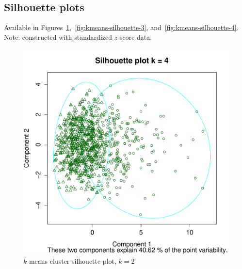 \documentclass[letterpaper,12pt]{article}
\begin{document}
\subsection{Silhouette plots}

Available in
Figures~\ref{fig:kmeans-silhouette-2},~\ref{fig:kmeans-silhouette-3},
and~\ref{fig:kmeans-silhouette-4}. Note: constructed with standardized
$z$-score data.

\begin{figure}[h]
  \centering
  \includegraphics[width=\linewidth]{kmeans-silhouette-2.pdf}
  \caption{$k$-means cluster silhouette plot, $k = 2$}
  \label{fig:kmeans-silhouette-2}
\end{figure}
\end{document}
